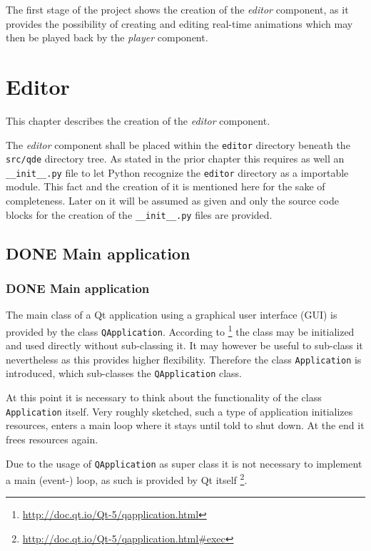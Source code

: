 \documentclass[10pt, openright, notitlepage]{scrreprt}
\begin{document}
The first stage of the project shows the creation of the \emph{editor} component, as
it provides the possibility of creating and editing real-time animations which
may then be played back by the \emph{player} component\cite[p. 29]{osterwalder_qde_2016}.
\section{Editor}
\label{sec:orgfac95f1}
This chapter describes the creation of the \emph{editor} component.

The \emph{editor} component shall be placed within the \texttt{editor} directory beneath the
\texttt{src/qde} directory tree. As stated in the prior chapter this requires as well
an \texttt{\_\_init\_\_.py} file to let Python recognize the \texttt{editor} directory as a
importable module. This fact and the creation of it is mentioned here for the
sake of completeness. Later on it will be assumed as given and only the source
code blocks for the creation of the \texttt{\_\_init\_\_.py} files are provided.
\subsection{{\bfseries\sffamily DONE} Main application}
\label{sec:org57dd000}
\subsubsection{{\bfseries\sffamily DONE} Main application}
\label{sec:orgdb440f9}
The main class of a Qt application using a graphical user interface (GUI)
is provided by the class \texttt{QApplication}. According to
\footnote{\url{http://doc.qt.io/Qt-5/qapplication.html}} the class may be initialized and
used directly without sub-classing it. It may however be useful to sub-class it
nevertheless as this provides higher flexibility. Therefore the class
\texttt{Application} is introduced, which sub-classes the \texttt{QApplication} class.

At this point it is necessary to think about the functionality of the class
\texttt{Application} itself. Very roughly sketched, such a type of application
initializes resources, enters a main loop where it stays until told to shut
down. At the end it frees resources again.

Due to the usage of \texttt{QApplication} as super class it is not necessary to
implement a main (event-) loop, as such is provided by Qt itself
\footnote{\url{http://doc.qt.io/Qt-5/qapplication.html\#exec}}.
\end{document}
